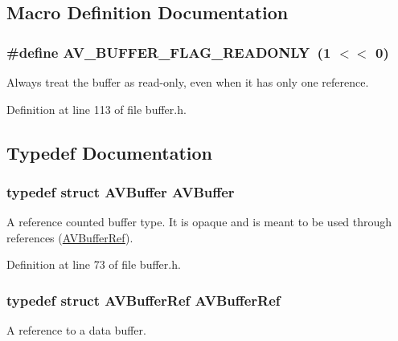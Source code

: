 \subsection{Macro Definition Documentation}
\subsubsection[{\texorpdfstring{A\+V\+\_\+\+B\+U\+F\+F\+E\+R\+\_\+\+F\+L\+A\+G\+\_\+\+R\+E\+A\+D\+O\+N\+LY}{AV_BUFFER_FLAG_READONLY}}]{\setlength{\rightskip}{0pt plus 5cm}\#define A\+V\+\_\+\+B\+U\+F\+F\+E\+R\+\_\+\+F\+L\+A\+G\+\_\+\+R\+E\+A\+D\+O\+N\+LY~(1 $<$$<$ 0)}\hypertarget{group__lavu__buffer_gaa818f8f1011d69acc50c1f29cb85e576}{}\label{group__lavu__buffer_gaa818f8f1011d69acc50c1f29cb85e576}
Always treat the buffer as read-\/only, even when it has only one reference. 

Definition at line 113 of file buffer.\+h.



\subsection{Typedef Documentation}
\subsubsection[{\texorpdfstring{A\+V\+Buffer}{AVBuffer}}]{\setlength{\rightskip}{0pt plus 5cm}typedef struct {\bf A\+V\+Buffer} {\bf A\+V\+Buffer}}\hypertarget{group__lavu__buffer_ga501d49df442180d584f255aa97b2549d}{}\label{group__lavu__buffer_ga501d49df442180d584f255aa97b2549d}
A reference counted buffer type. It is opaque and is meant to be used through references (\hyperlink{struct_a_v_buffer_ref}{A\+V\+Buffer\+Ref}). 

Definition at line 73 of file buffer.\+h.

\subsubsection[{\texorpdfstring{A\+V\+Buffer\+Ref}{AVBufferRef}}]{\setlength{\rightskip}{0pt plus 5cm}typedef struct {\bf A\+V\+Buffer\+Ref}  {\bf A\+V\+Buffer\+Ref}}\hypertarget{group__lavu__buffer_ga433e680d11ad786bd1bc20f5616c7d19}{}\label{group__lavu__buffer_ga433e680d11ad786bd1bc20f5616c7d19}
A reference to a data buffer.

